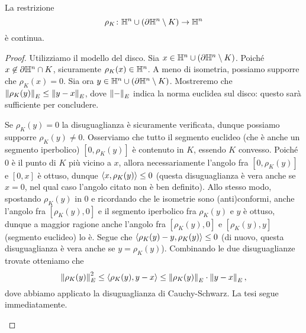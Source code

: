 \begin{proposition*}
La restrizione
\[
\rho_K\colon\mathbb{H}^n\cup(\partial\mathbb{H}^n\setminus K)\to\mathbb{H}^n
\]
è continua.
\end{proposition*}
\begin{proof}
Utilizziamo il modello del disco. Sia $x\in\mathbb{H}^n\cup(\partial\mathbb{H}^n\setminus K)$. Poiché $x\not\in\partial\mathbb{H}^n\cap K$, sicuramente $\rho_K(x)\in\mathbb{H}^n$. A meno di isometria, possiamo supporre che $\rho_K(x)=0$. Sia ora $y\in\mathbb{H}^n\cup(\partial\mathbb{H}^n\setminus K)$. Mostreremo che $\left\lVert\rho_K(y)\right\rVert_E\le\left\lVert y-x\right\rVert_E$, dove $\left\lVert-\right\rVert_E$ indica la norma euclidea sul disco: questo sarà sufficiente per concludere.

Se $\rho_K(y)=0$ la disuguaglianza è sicuramente verificata, dunque possiamo supporre $\rho_K(y)\neq 0$. Osserviamo che tutto il segmento euclideo (che è anche un segmento iperbolico) $[0,\rho_K(y)]$ è contenuto in $K$, essendo $K$ convesso. Poiché $0$ è il punto di $K$ più vicino a $x$, allora necessariamente l'angolo fra $[0,\rho_K(y)]$ e $[0,x]$ è ottuso, dunque $\left\langle x,\rho_K(y)\right\rangle\le 0$ (questa disuguaglianza è vera anche se $x=0$, nel qual caso l'angolo citato non è ben definito). Allo stesso modo, spostando $\rho_K(y)$ in $0$ e ricordando che le isometrie sono (anti)conformi, anche l'angolo fra $[\rho_K(y),0]$ e il segmento iperbolico fra $\rho_K(y)$ e $y$ è ottuso, dunque a maggior ragione anche l'angolo fra $[\rho_K(y),0]$ e $[\rho_K(y),y]$ (segmento euclideo) lo è. Segue che $\left\langle\rho_K(y)-y,\rho_K(y)\right\rangle\le 0$ (di nuovo, questa disuguaglianza è vera anche se $y=\rho_K(y)$). Combinando le due disuguaglianze trovate otteniamo che
\[
\left\lVert\rho_K(y)\right\rVert^2_E\le\left\langle\rho_K(y),y-x\right\rangle\le\left\lVert\rho_K(y)\right\rVert_E\cdot\left\lVert y-x\right\rVert_E,
\]
dove abbiamo applicato la disuguaglianza di Cauchy-Schwarz. La tesi segue immediatamente.
\begin{figure}[h!]
\centering
{}
\end{figure}
\end{proof}


